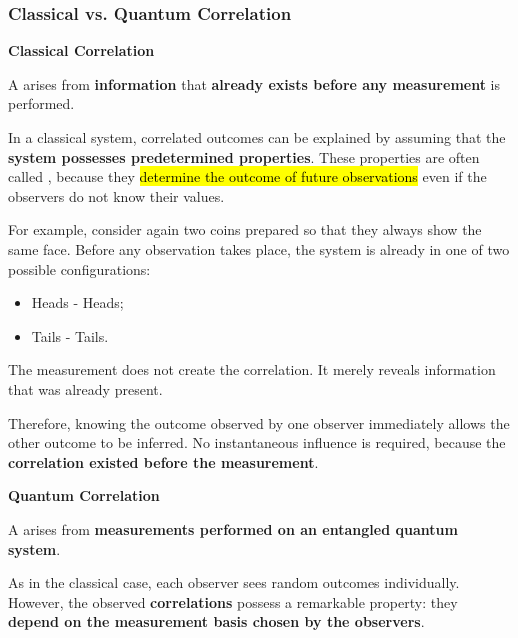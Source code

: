 \subsubsection{Classical vs. Quantum Correlation}

\begin{flushleft}
    \textcolor{Green3}{ \textbf{Classical Correlation}}
\end{flushleft}
A  arises from \textbf{information} that \textbf{already exists before any measurement} is performed.

\highspace
In a classical system, correlated outcomes can be explained by assuming that the \textbf{system possesses predetermined properties}. These properties are often called , because they \hl{determine the outcome of future observations} even if the observers do not know their values.

\highspace
\begin{examplebox}
    For example, consider again two coins prepared so that they always show the same face. Before any observation takes place, the system is already in one of two possible configurations:
    \begin{itemize}
        \item Heads - Heads;
        \item Tails - Tails.
    \end{itemize}
    The measurement does not create the correlation. It merely reveals information that was already present.
\end{examplebox}

\highspace
Therefore, knowing the outcome observed by one observer immediately allows the other outcome to be inferred. No instantaneous influence is required, because the \textbf{correlation existed before the measurement}.

\highspace
\begin{flushleft}
    \textcolor{Green3}{ \textbf{Quantum Correlation}}
\end{flushleft}
A  arises from \textbf{measurements performed on an entangled quantum system}.

\highspace
As in the classical case, each observer sees random outcomes individually. However, the observed \textbf{correlations} possess a remarkable property: they \textbf{depend on the measurement basis chosen by the observers}.


